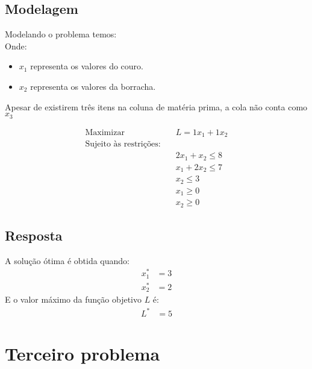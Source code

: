\documentclass{article}
\begin{document}
\subsection{Modelagem}

Modelando o problema temos:
\\
Onde:
\begin{itemize}
    \item \(x_1\) representa os valores do couro.
    \item \(x_2\) representa os valores da borracha.
\end{itemize}

\begin{tcolorbox}[colback=yellow!10!white, colframe=red!75!black, title=Importante]
Apesar de existirem três itens na coluna de matéria prima, a cola não conta como \(x_3\)
\end{tcolorbox}

\begin{align*}
    \text{Maximizar} \quad & L = 1x_1 + 1x_2 \\
    \text{Sujeito às restrições:} \quad & \\
    & 2x_1 + x_2 \leq 8 \\
    & x_1 + 2x_2 \leq 7 \\
    & x_2 \leq 3 \\
    & x_1 \geq 0 \\
    & x_2 \geq 0
\end{align*}

\subsection{Resposta}


\begin{tcolorbox}[colback=blue!5!white, colframe=blue!75!black, title=Resultado]
A solução ótima é obtida quando:
\begin{align*}
    x_1^* &= 3 \\
    x_2^* &= 2
\end{align*}
E o valor máximo da função objetivo \(L\) é:
\begin{align*}
    L^* &= 5
\end{align*}
\end{tcolorbox}


\clearpage

\section{Terceiro problema}
\end{document}
